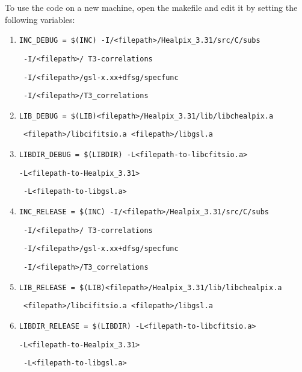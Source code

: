 \documentclass[12]{article}
\begin{document}
To use the code on a new machine, open the makefile and edit it by setting the following variables:
\begin{enumerate}
\item {\verb}INC_DEBUG = $(INC) -I/<filepath>/Healpix_3.31/src/C/subs}}

{\verb} -I/<filepath>/ T3-correlations}}

{\verb} -I/<filepath>/gsl-x.xx+dfsg/specfunc}}

{\verb} -I/<filepath>/T3_correlations}}
\item {\verb}LIB_DEBUG = $(LIB)<filepath>/Healpix_3.31/lib/libchealpix.a}}

{\verb} <filepath>/libcifitsio.a <filepath>/libgsl.a}}

\item {\verb}LIBDIR_DEBUG = $(LIBDIR) -L<filepath-to-libcfitsio.a>}} 

{\verb}-L<filepath-to-Healpix_3.31>}} 

{\verb} -L<filepath-to-libgsl.a>}}

\item {\verb}INC_RELEASE = $(INC) -I/<filepath>/Healpix_3.31/src/C/subs}}

{\verb} -I/<filepath>/ T3-correlations}}

{\verb} -I/<filepath>/gsl-x.xx+dfsg/specfunc}}

{\verb} -I/<filepath>/T3_correlations}}
\item {\verb}LIB_RELEASE = $(LIB)<filepath>/Healpix_3.31/lib/libchealpix.a}}

{\verb} <filepath>/libcifitsio.a <filepath>/libgsl.a}}

\item {\verb}LIBDIR_RELEASE = $(LIBDIR) -L<filepath-to-libcfitsio.a>}} 

{\verb}-L<filepath-to-Healpix_3.31>}} 

{\verb} -L<filepath-to-libgsl.a>}}
\end{enumerate}
\end{document}

